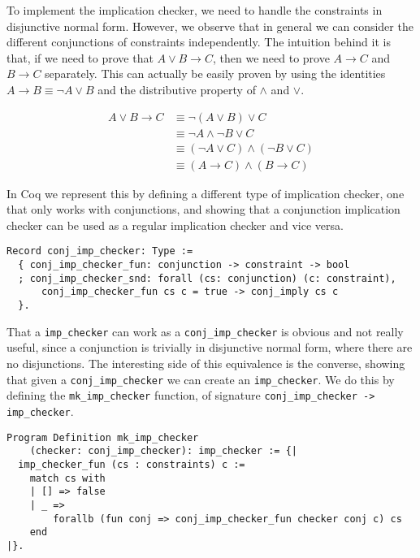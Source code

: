 To implement the implication checker, we need to handle the constraints in disjunctive normal form. 
However, we observe that in general we can consider the different conjunctions of constraints 
independently. The intuition behind it is that, if we need to prove that $A \vee B \rightarrow C$, 
then we need to prove $A \rightarrow C$ and $B \rightarrow C$ separately. This can actually be easily 
proven by using the identities $A \rightarrow B \equiv \neg A \vee B$ and the distributive property of 
$\wedge$ and $\vee$.

\begin{align*}
A \vee B \rightarrow C &\equiv \neg (A \vee B) \vee C \\
                       &\equiv \neg A \wedge \neg B \vee C \\
                       &\equiv (\neg A \vee C)\wedge (\neg B \vee C) \\
                       &\equiv (A \rightarrow C)\wedge (B \rightarrow C)
\end{align*}


In Coq we represent this by defining a different type of implication checker, one that only works with 
conjunctions, and showing that a conjunction implication checker can be used as a regular implication
checker and vice versa.

\begin{verbatim}
Record conj_imp_checker: Type := 
  { conj_imp_checker_fun: conjunction -> constraint -> bool
  ; conj_imp_checker_snd: forall (cs: conjunction) (c: constraint),
      conj_imp_checker_fun cs c = true -> conj_imply cs c
  }.
\end{verbatim}

That a \texttt{imp_checker} can work as a \texttt{conj_imp_checker} is obvious and 
not really useful, since a conjunction is trivially in disjunctive normal form, where there are no 
disjunctions. The interesting side of this equivalence is the converse, showing that given a 
\texttt{conj_imp_checker} we can create an \texttt{imp_checker}. We do this by 
defining the \texttt{mk_imp_checker} function, of signature 
\texttt{conj_imp_checker -> imp_checker}.

\begin{verbatim}
Program Definition mk_imp_checker 
    (checker: conj_imp_checker): imp_checker := {|
  imp_checker_fun (cs : constraints) c := 
    match cs with
    | [] => false
    | _ => 
        forallb (fun conj => conj_imp_checker_fun checker conj c) cs
    end
|}.
\end{verbatim}

